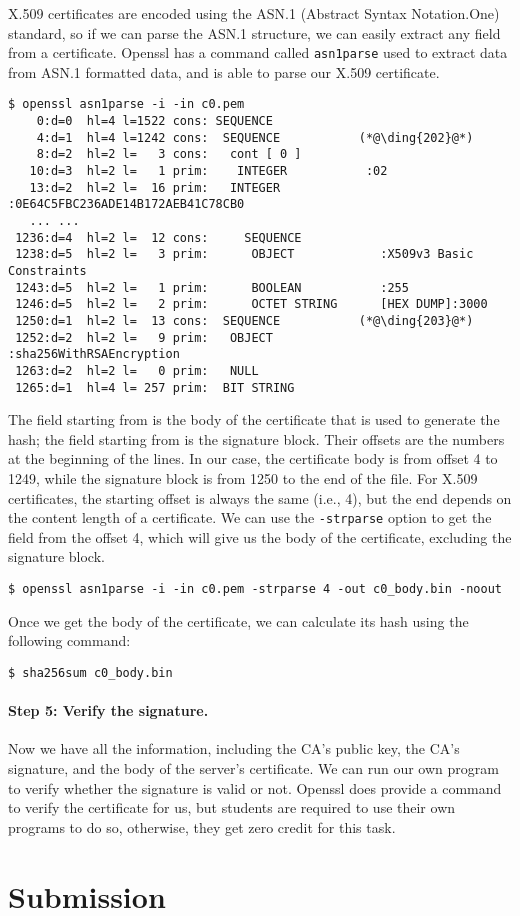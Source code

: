 X.509 certificates are encoded using the ASN.1 (Abstract Syntax Notation.One) standard,
so if we can parse the ASN.1 structure, we can easily extract any field from a certificate.
Openssl has a command called \texttt{asn1parse} used to extract data from ASN.1 formatted data,
and is able to parse our X.509 certificate.


\begin{lstlisting}
$ openssl asn1parse -i -in c0.pem
    0:d=0  hl=4 l=1522 cons: SEQUENCE
    4:d=1  hl=4 l=1242 cons:  SEQUENCE           (*@\ding{202}@*)
    8:d=2  hl=2 l=   3 cons:   cont [ 0 ]
   10:d=3  hl=2 l=   1 prim:    INTEGER           :02
   13:d=2  hl=2 l=  16 prim:   INTEGER           :0E64C5FBC236ADE14B172AEB41C78CB0
   ... ...
 1236:d=4  hl=2 l=  12 cons:     SEQUENCE
 1238:d=5  hl=2 l=   3 prim:      OBJECT            :X509v3 Basic Constraints
 1243:d=5  hl=2 l=   1 prim:      BOOLEAN           :255
 1246:d=5  hl=2 l=   2 prim:      OCTET STRING      [HEX DUMP]:3000
 1250:d=1  hl=2 l=  13 cons:  SEQUENCE           (*@\ding{203}@*)
 1252:d=2  hl=2 l=   9 prim:   OBJECT            :sha256WithRSAEncryption
 1263:d=2  hl=2 l=   0 prim:   NULL
 1265:d=1  hl=4 l= 257 prim:  BIT STRING
\end{lstlisting}


The field starting from  is the body of the certificate that is used to generate the hash; the
field starting from  is the signature block. Their offsets are the numbers at the beginning
of the lines. In our case, the certificate body is from offset 4 to 1249, while the
signature block is from 1250 to the end of the file. For X.509 certificates, the starting
offset is always the same (i.e., 4), but the end depends on the content length of a
certificate.  We can use the
\texttt{-strparse} option to get the field from the offset 4, which will give us the body of
the certificate, excluding the signature block.

\begin{lstlisting}
$ openssl asn1parse -i -in c0.pem -strparse 4 -out c0_body.bin -noout
\end{lstlisting}

Once we get the body of the certificate, we can calculate its hash using the following
command:

\begin{lstlisting}
$ sha256sum c0_body.bin
\end{lstlisting}



\paragraph{Step 5: Verify the signature.}
Now we have all the information, including the CA's public key, the CA's signature, and the
body of the server's certificate. We can run our own program to verify whether the
signature is valid or not. Openssl does provide a command to verify the certificate for
us, but students are required to use their own programs to do so, otherwise, they get zero
credit for this task.


\section{Submission}





